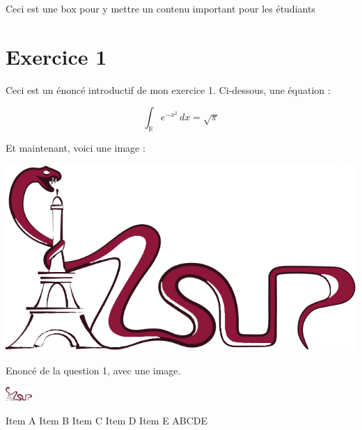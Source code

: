 \documentclass[12pt]{article}
\begin{document}
\recto
\grille


\begin{motRM}[
        titre=Mot de votre RM,
    ]
    Ceci est une box pour y mettre un contenu important pour les étudiants 
\end{motRM}

\newpage


\section*{Exercice 1}

\inseparable %

Ceci est un énoncé introductif de mon exercice 1. Ci-dessous, une équation :

$$
\int_{\mathbb R} e^{-x^2}\, dx = \sqrt{\pi}
$$

Et maintenant, voici une image :

\includegraphics[width=0.2\linewidth]{logo.png}

{
    Enoncé de la question 1, avec une image.
    
    \begin{center}
        \includegraphics[width=1cm]{logo.png}
    \end{center}
}
{Item A}
{Item B}
{Item C}
{Item D}
{Item E}
{ABCDE}
\end{document}
